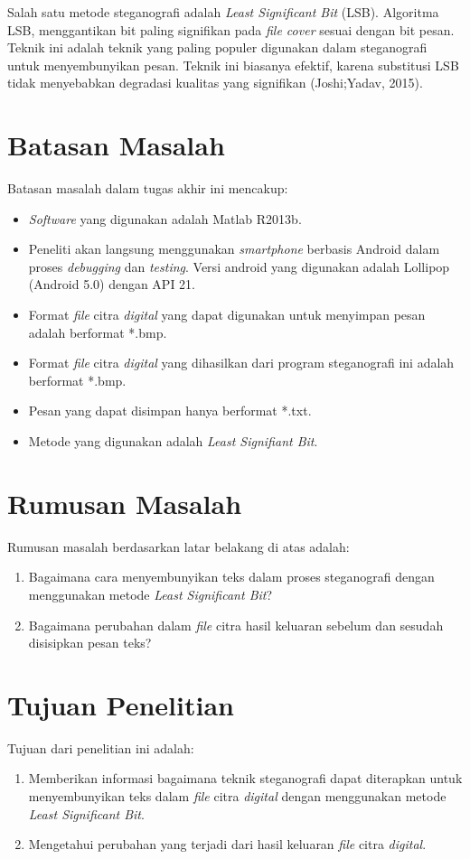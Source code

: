 Salah satu metode steganografi adalah \emph{Least Significant Bit} (LSB). Algoritma LSB, menggantikan bit paling signifikan pada \emph{file cover} sesuai dengan bit pesan. Teknik ini adalah teknik yang paling populer digunakan dalam steganografi untuk menyembunyikan pesan. Teknik ini biasanya efektif, karena substitusi LSB tidak menyebabkan degradasi kualitas yang signifikan  (Joshi;Yadav, 2015).

\section{Batasan Masalah}
Batasan masalah dalam tugas akhir ini mencakup:
\begin{itemize}
	\item \emph{Software} yang digunakan adalah Matlab R2013b.
	\item  Peneliti akan langsung menggunakan \emph{smartphone} berbasis Android dalam proses \emph{debugging} dan \emph{testing}. Versi android yang digunakan adalah Lollipop (Android 5.0) dengan API 21.
	\item Format \emph{file}  citra \emph{digital} yang dapat digunakan untuk menyimpan pesan adalah berformat *.bmp.
	\item Format \emph{file}  citra \emph{digital} yang dihasilkan dari program steganografi ini adalah berformat *.bmp.
	\item Pesan yang dapat disimpan hanya berformat *.txt.
	\item Metode yang digunakan adalah \emph{Least Signifiant Bit}.
\end{itemize}

\section{Rumusan Masalah}
Rumusan masalah berdasarkan latar belakang di atas adalah:
\begin{enumerate}
	\item Bagaimana cara menyembunyikan teks dalam proses steganografi dengan menggunakan metode \emph{Least Significant Bit}?
	\item Bagaimana perubahan dalam \emph{file} citra hasil keluaran sebelum dan sesudah disisipkan pesan teks?
\end{enumerate}


\section{Tujuan Penelitian}
Tujuan dari penelitian ini adalah: 
\begin{enumerate}
	\item Memberikan informasi bagaimana teknik steganografi dapat diterapkan untuk menyembunyikan teks dalam \emph{file} citra \emph{digital} dengan menggunakan metode \emph{Least Significant Bit}. 
	\item Mengetahui perubahan yang terjadi dari hasil keluaran \emph{file} citra \emph{digital}.
\end{enumerate}

